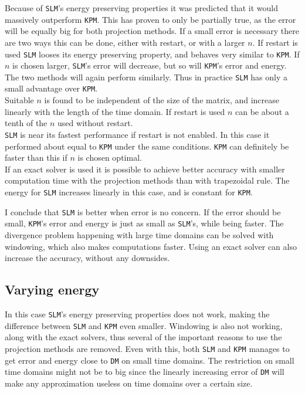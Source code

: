 \noindent Because of \texttt{SLM}'s energy preserving properties it was predicted that it would massively outperform \texttt{KPM}. This has proven to only be partially true, as the error will be equally big for both projection methods. 
If a small error is necessary there are two ways this can be done, either with restart, or with a larger $n$. If restart is used \texttt{SLM} looses its energy preserving property, and behaves very similar to \texttt{KPM}. If $n$ is chosen larger, \texttt{SLM}'s error will decrease, but so will \texttt{KPM}'s error and energy. The two methods will again perform similarly. Thus in practice \texttt{SLM} has only a small advantage over \texttt{KPM}.\\

\noindent Suitable $n$ is found to be independent of the size of the matrix, and increase linearly with the length of the time domain. If restart is used $n$ can be about a tenth of the $n$ used without restart.\\

\noindent \texttt{SLM} is near its fastest performance if restart is not enabled. In this case it performed about equal to \texttt{KPM} under the same conditions. \texttt{KPM} can definitely be faster than this if $n$ is chosen optimal. \\

\noindent If an exact solver is used it is possible to achieve better accuracy with smaller computation time with the projection methods than with trapezoidal rule. The energy for \texttt{SLM} increases linearly in this case, and is constant for \texttt{KPM}.

\noindent I conclude that \texttt{SLM} is better when error is no concern. If the error should be small, \texttt{KPM}'s error and energy is just as small as \texttt{SLM}'s, while being faster. The divergence problem happening with large time domains can be solved with windowing, which also makes computations faster. Using an exact solver can also increase the accuracy, without any downsides.
\subsection{Varying energy} %
In this case \texttt{SLM}'s energy preserving properties does not work, making the difference between \texttt{SLM} and \texttt{KPM} even smaller. Windowing is also not working, along with the exact solvers, thus several of the important reasons to use the projection methods are removed. Even with this, both \texttt{SLM} and \texttt{KPM} manages to get error and energy close to \texttt{DM} on small time domains. The restriction on small time domains might not be to big since the linearly increasing error of \texttt{DM} will make any approximation useless on time domains over a certain size.\\

